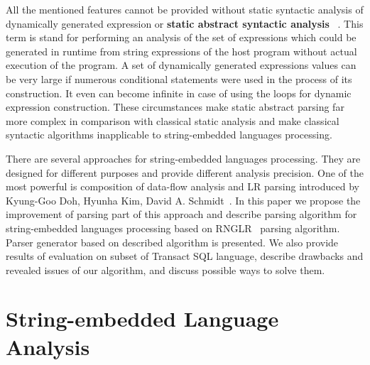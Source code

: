 \documentclass{sigplanconf}
\begin{document}
All the mentioned features cannot be provided without static syntactic analysis of dynamically generated expression or {\bf static abstract syntactic analysis} ~\cite{AbstrParsing}. This term is stand for performing an analysis of the set of expressions which could be generated in runtime from string expressions of the host program without actual execution of the program. A set of dynamically generated expressions values can be very large if numerous conditional statements were used in the process of its construction. It even can become infinite in case of using the loops for dynamic expression construction. These circumstances make static abstract parsing far more complex in comparison with classical static analysis and make classical syntactic algorithms inapplicable to string-embedded languages processing.

There are several approaches for string-embedded languages processing. They are designed for different purposes and provide different analysis precision. One of the most powerful is composition of data-flow analysis and LR parsing introduced by Kyung-Goo Doh, Hyunha Kim, David A. Schmidt~\cite{LRAbstrParsing}. In this paper we propose the improvement of parsing part of this approach and describe parsing algorithm for string-embedded languages processing based on RNGLR~\cite{RNGLR} parsing algorithm. Parser generator based on described algorithm is presented. We also provide results of evaluation on subset of Transact SQL language, describe drawbacks and revealed issues of our algorithm, and discuss possible ways to solve them.

\section{String-embedded Language Analysis}
\end{document}
